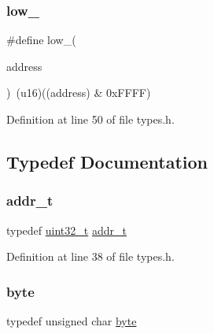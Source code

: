 \mbox{\label{a00038_aded7ad58a4bedfffea10d5ae9c0c817e_aded7ad58a4bedfffea10d5ae9c0c817e}} 
\subsubsection{\texorpdfstring{low\+\_}{low\_16}}
{\footnotesize\ttfamily \#define low\+\_(\begin{DoxyParamCaption}\item[{}]{address }\end{DoxyParamCaption})~(u16)((address) \& 0x\+F\+F\+F\+F)}



Definition at line 50 of file types.\+h.



\subsection{Typedef Documentation}
\mbox{\label{a00038_a9ebd1e228aedd29e18d3dffa6f49e75a_a9ebd1e228aedd29e18d3dffa6f49e75a}} 
\subsubsection{\texorpdfstring{addr\+\_\+t}{addr\_t}}
{\footnotesize\ttfamily typedef \hyperlink{a00038_a435d1572bf3f880d55459d9805097f62_a435d1572bf3f880d55459d9805097f62}{uint32\+\_\+t} \hyperlink{a00038_a9ebd1e228aedd29e18d3dffa6f49e75a_a9ebd1e228aedd29e18d3dffa6f49e75a}{addr\+\_\+t}}



Definition at line 38 of file types.\+h.

\mbox{\label{a00038_a0c8186d9b9b7880309c27230bbb5e69d_a0c8186d9b9b7880309c27230bbb5e69d}} 
\subsubsection{\texorpdfstring{byte}{byte}}
{\footnotesize\ttfamily typedef unsigned char \hyperlink{a00038_a0c8186d9b9b7880309c27230bbb5e69d_a0c8186d9b9b7880309c27230bbb5e69d}{byte}}



